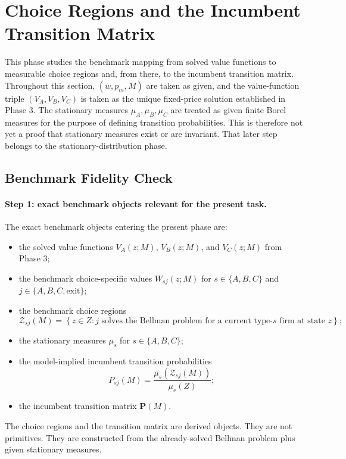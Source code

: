 \section{Choice Regions and the Incumbent Transition Matrix}

This phase studies the benchmark mapping from solved value functions to measurable choice regions and, from there, to the incumbent transition matrix. Throughout this section, $(w,p_m,M)$ are taken as given, and the value-function triple $(V_A,V_B,V_C)$ is taken as the unique fixed-price solution established in Phase 3. The stationary measures $\mu_A,\mu_B,\mu_C$ are treated as given finite Borel measures for the purpose of defining transition probabilities. This is therefore not yet a proof that stationary measures exist or are invariant. That later step belongs to the stationary-distribution phase.

\subsection{Benchmark Fidelity Check}

\paragraph{Step 1: exact benchmark objects relevant for the present task.}
The exact benchmark objects entering the present phase are:
\begin{itemize}
    \item the solved value functions $V_A(z;M)$, $V_B(z;M)$, and $V_C(z;M)$ from Phase 3;
    \item the benchmark choice-specific values $W_{sj}(z;M)$ for $s\in\{A,B,C\}$ and $j\in\{A,B,C,\mathrm{exit}\}$;
    \item the benchmark choice regions
    \[
    \mathcal Z_{sj}(M)=\left\{z\in Z: j \text{ solves the Bellman problem for a current type-}s\text{ firm at state }z\right\};
    \]
    \item the stationary measures $\mu_s$ for $s\in\{A,B,C\}$;
    \item the model-implied incumbent transition probabilities
    \[
    P_{sj}(M)=\frac{\mu_s(\mathcal Z_{sj}(M))}{\mu_s(Z)};
    \]
    \item the incumbent transition matrix $\mathbf P(M)$.
\end{itemize}
The choice regions and the transition matrix are derived objects. They are not primitives. They are constructed from the already-solved Bellman problem plus given stationary measures.

